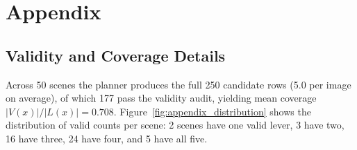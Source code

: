 \clearpage
\appendix
\renewcommand{\thefigure}{A\arabic{figure}}
\renewcommand{\thetable}{A\arabic{table}}
\setcounter{figure}{0}
\setcounter{table}{0}
\section{Appendix}

\subsection{Validity and Coverage Details}
\label{sec:validity_appendix}

Across 50 scenes the planner produces the full 250 candidate rows
(5.0 per image on average), of which 177 pass the validity audit,
yielding mean coverage $|V(x)|/|L(x)| = 0.708$.
Figure~\ref{fig:appendix_distribution} shows the distribution of valid counts per
scene: 2 scenes have one valid lever, 3 have two, 16 have three,
24 have four, and 5 have all five.

\begin{table}[t]
  \centering
  \caption{Family-level summary over the full $N{=}50$ run.
  Valid-rate intervals are 95\% Wilson confidence intervals; mean
  $\Delta_{\mathrm{aux}}$ and $\Delta_{\mathrm{aux}}$ [95\% CI] are
  computed over valid edits only.}
  \label{tab:family_appendix}
  \scriptsize
\end{table}

